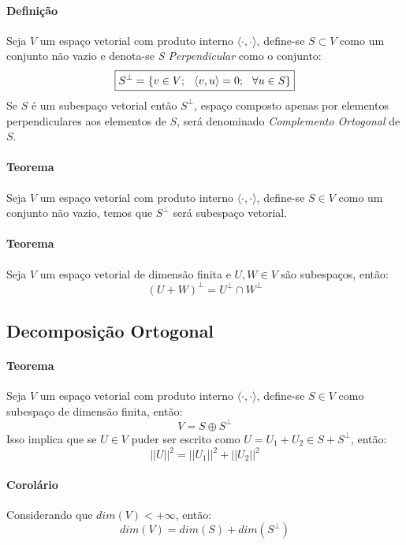 \documentclass{article}
\begin{document}
            \paragraph{Definição}Seja $V$ um espaço vetorial com produto interno $\langle\cdot,\cdot\rangle$, define-se $S\subset V$ como um conjunto não vazio e denota-se \textit{S Perpendicular} como o conjunto:
                \[\boxed{S^{\bot} = \{v\in V; \hspace{2.5mm} \langle v, u\rangle = 0; \hspace{2.5mm} \forall u\in S\}}\]
            Se $S$ é um subespaço vetorial então $S^{\bot}$, espaço composto apenas por elementos perpendiculares aos elementos de $S$, será denominado \textit{Complemento Ortogonal} de $S$.

            \paragraph{Teorema}Seja $V$ um espaço vetorial com produto interno $\langle\cdot,\cdot\rangle$, define-se $S\in V$ como um conjunto não vazio, temos que $S^{\bot}$ será subespaço vetorial.

            \paragraph{Teorema}Seja $V$ um espaço vetorial de dimensão finita e $U, W \in V$ são subespaços, então:
                \[\boxed{(U+W)^{\bot} = U^{\bot} \cap W^{\bot}}\]

        \subsection{Decomposição Ortogonal}
            \paragraph{Teorema}Seja $V$ um espaço vetorial com produto interno $\langle\cdot,\cdot\rangle$, define-se $S\in V$ como subespaço de dimensão finita, então:
                \[\boxed{V = S \oplus S^{\bot}}\]
            Isso implica que se $U \in V$ puder ser escrito como $U = U_{1} + U_{2} \in S + S^{\bot}$, então:   
                \[\boxed{||U||^{2} = ||U_{1}||^{2} + ||U_{2}||^{2}}\]

            \paragraph{Corolário}Considerando que $dim(V)< +\infty$, então:
                \[\boxed{dim(V) = dim(S) + dim(S^{\bot})}\]
\end{document}
